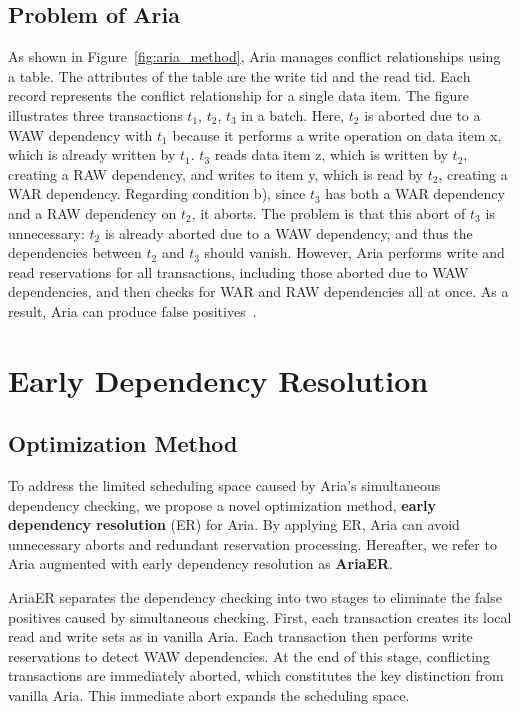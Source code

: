 \documentclass[english,preprint,JIP]{ipsj}
\begin{document}
\subsection{Problem of Aria}
\label{sec:problem_aria}
As shown in Figure~\ref{fig:aria_method}, Aria manages conflict relationships using a table. 
The attributes of the table are the write tid and the read tid. Each record represents the conflict relationship for a single data item.
The figure illustrates three transactions $t_1$, $t_2$, $t_3$ in a batch. 
%
Here, $t_2$ is aborted due to a WAW dependency with $t_1$ because it performs a write operation on data item x, which is already written by $t_1$.
%
$t_3$ reads data item z, which is written by $t_2$, creating a RAW dependency, and writes to item y, which is read by $t_2$, creating a WAR dependency. Regarding condition b), since $t_3$ has both a WAR dependency and a RAW dependency on $t_2$, it aborts. 
%
The problem is that this abort of $t_3$ is unnecessary: $t_2$ is already aborted due to a WAW dependency, and thus the dependencies between $t_2$ and $t_3$ should vanish. However, Aria performs write and read reservations for all transactions, including those aborted due to WAW dependencies, and then checks for WAR and RAW dependencies all at once. As a result, Aria can produce false positives~\cite{weikum2001}.


\section{Early Dependency Resolution}
\subsection{Optimization Method}
To address the limited scheduling space caused by Aria's simultaneous dependency checking, we propose a novel optimization method, \textbf{early dependency resolution} (ER) for Aria. 
%
By applying ER, Aria can avoid unnecessary aborts and redundant reservation processing.
%
Hereafter, we refer to Aria augmented with early dependency resolution as \textbf{AriaER}.
%

AriaER separates the dependency checking into two stages to eliminate the false positives caused by simultaneous checking. 
%
First, each transaction creates its local read and write sets as in vanilla Aria. 
Each transaction then performs write reservations to detect WAW dependencies. 
%
At the end of this stage, conflicting transactions are immediately aborted, which constitutes the key distinction from vanilla Aria. This immediate abort expands the scheduling space.
%
\end{document}
